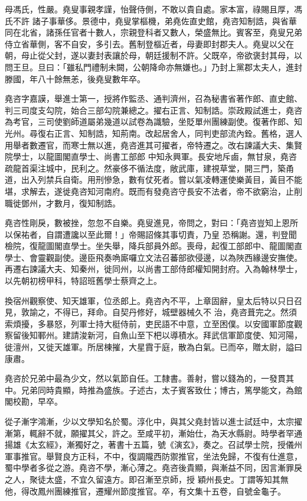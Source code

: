 \begin{pinyinscope}
 母馮氏，性嚴。堯叟事親孝謹，怡聲侍側，不敢以貴自處。家本富，祿賜且厚，馮氏不許
 諸子事華侈。景德中，堯叟掌樞機，弟堯佐直史館，堯咨知制誥，與省華同在北省，諸孫任官者十數人，宗親登科者又數人，榮盛無比。賓客至，堯叟兄弟侍立省華側，客不自安，多引去。舊制登樞近者，母妻即封郡夫人。堯叟以父在朝，母止從父封，遂以妻封表讓於母，朝廷援制不許。父既卒，帝欲褒封其母，以問王旦。旦曰：「雖私門禮制未闕，公朝降命亦無嫌也。」乃封上黨郡太夫人，進封滕國，年八十餘無恙，後堯叟數年卒。



 堯咨字嘉謨，舉進士第一，授將作監丞、通判濟州，召為秘書省著作郎、直史館、判三司度支勾院，始合三部勾院兼總之。擢右正言、知制誥。崇政殿試進士，堯咨為考官，三司使劉師道屬弟幾道以試卷為識驗，坐貶單州團練副使。復著作郎、知光州。尋復右正言、知制誥，知荊南。改起居舍人，同判吏部流內銓。舊格，選人用舉者數遷官，而寒士無以進，堯咨進其可擢者，帝特遷之。改右諫議大夫、集賢院學士，以龍圖閣直學士、尚書工部郎
 中知永興軍。長安地斥鹵，無甘泉，堯咨疏龍首渠注城中，民利之。然豪侈不循法度，敞武庫，建視草堂，開三門，築甬道，出入列禁兵自衛。用刑慘急，數有仗死者。嘗以氣凌轉運使樂黃目，黃目不能堪，求解去，遂徙堯咨知河南府。既而有發堯咨守長安不法者，帝不欲窮治，止削職徙鄧州，才數月，復知制誥。



 堯咨性剛戾，數被挫，忽忽不自樂。堯叟進見，帝問之，對曰：「堯咨豈知上恩所以保祐者，自謂遭讒以至此爾！」帝賜詔條其事切責，乃皇
 恐稱謝。還，判登聞檢院，復龍圖閣直學士。坐失舉，降兵部員外郎。喪母，起復工部郎中、龍圖閣直學士、會靈觀副使。邊臣飛奏唃廝囉立文法召蕃部欲侵邊，以為陜西緣邊安撫使。再遷右諫議大夫、知秦州，徙同州，以尚書工部侍郎權知開封府。入為翰林學士，以先朝初榜甲科，特詔班舊學士蔡齊之上。



 換宿州觀察使、知天雄軍，位丞郎上。堯咨內不平，上章固辭，皇太后特以只日召見，敦諭之，不得已，拜命。自契丹修好，城壁器械久不
 治，堯咨葺完之。然須索煩擾，多暴怒，列軍士持大梃侍前，吏民語不中意，立至困僕。以安國軍節度觀察留後知鄆州。建請浚新河，自魚山至下杷以導積水。拜武信軍節度使、知河陽，徙澶州，又徙天雄軍。所居棟摧，大星霣于庭，散為白氣。已而卒，贈太尉，謚曰康肅。



 堯咨於兄弟中最為少文，然以氣節自任。工隸書。善射，嘗以錢為的，一發貫其中。兄弟同時貴顯，時推為盛族。子述古，太子賓客致仕；博古，篤學能文，為館閣校勘，早卒。



 從子漸字鴻漸，少以文學知名於蜀。淳化中，與其父堯封皆以進士試廷中，太宗擢漸第，輒辭不就，願擢其父，許之。至咸平初，漸始仕，為天水縣尉。時學者罕通揚雄《太玄經》，漸獨好之，著書十五篇，號《演玄》，奏之。召試學士院，授儀州軍事推官。舉賢良方正科，不中，復調隴西防禦推官，坐法免歸，不復有仕進意，蜀中學者多從之游。堯咨不學，漸心薄之。堯咨後貴顯，與漸益不同，因言漸罪戾之人，聚徒太盛，不宜久留遠方。即召漸至京師，授
 穎州長史。丁謂等知其無他，得改鳳州團練推官，遷耀州節度推官。卒，有文集十五卷，自號金龜子。




\end{pinyinscope}
